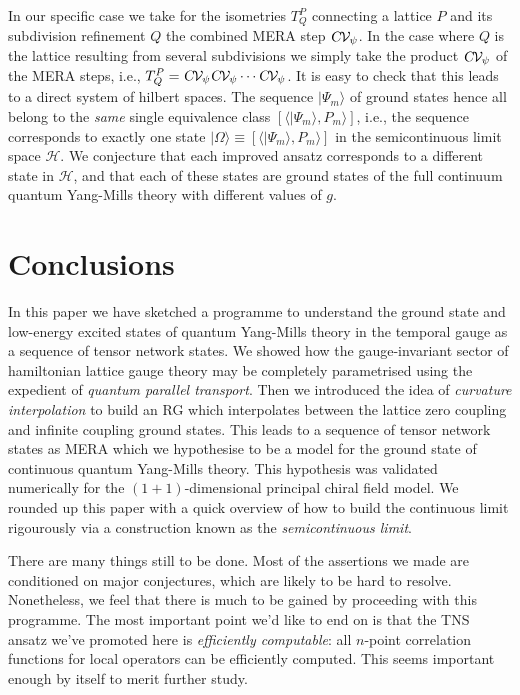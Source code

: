 \documentclass[twocolumn,lengthcheck,superscriptaddress]{revtex4-1}
\theoremstyle{definition}
\theoremstyle{remark}
\begin{document}
In our specific case we take for the isometries $T^{P}_Q$ connecting a lattice $P$ and its subdivision refinement $Q$ the combined MERA step $\textsl{C}\mathcal{V}_{\psi}$. In the case where $Q$ is the lattice resulting from several subdivisions we simply take the product $\textsl{C}\mathcal{V}_{\psi}$ of the MERA steps, i.e., $T^{P}_Q = \textsl{C}\mathcal{V}_{\psi}\textsl{C}\mathcal{V}_{\psi}\cdots \textsl{C}\mathcal{V}_{\psi}$. It is easy to check that this leads to a direct system of hilbert spaces. The sequence $|\Psi_m\rangle$ of ground states hence all belong to the \emph{same} single equivalence class $[\langle |\Psi_m\rangle, P_m\rangle]$, i.e., the sequence corresponds to exactly one state $|\Omega\rangle \equiv [\langle |\Psi_m\rangle, P_m\rangle]$ in the semicontinuous limit space $\mathcal{H}$. We conjecture that each improved ansatz corresponds to a different state in $\mathcal{H}$, and that each of these states are ground states of the full continuum quantum Yang-Mills theory with different values of $g$. 

\section{Conclusions}
In this paper we have sketched a programme to understand the ground state and low-energy excited states of quantum Yang-Mills theory in the temporal gauge as a sequence of tensor network states. We showed how the gauge-invariant sector of hamiltonian lattice gauge theory may be completely parametrised using the expedient of \emph{quantum parallel transport}. Then we introduced the idea of \emph{curvature interpolation} to build an RG which interpolates between the lattice zero coupling and infinite coupling ground states. This leads to a sequence of tensor network states as MERA which we hypothesise to be a model for the ground state of continuous quantum Yang-Mills theory. This hypothesis was validated numerically for the $(1+1)$-dimensional principal chiral field model. We rounded up this paper with a quick overview of how to build the continuous limit rigourously via a construction known as the \emph{semicontinuous limit}. 

There are many things still to be done. Most of the assertions we made are conditioned on major conjectures, which are likely to be hard to resolve. Nonetheless, we feel that there is much to be gained by proceeding with this programme. The most important point we'd like to end on is that the TNS ansatz we've promoted here is \emph{efficiently computable}: all $n$-point correlation functions for local operators can be efficiently computed. This seems important enough by itself to merit further study. 



\end{document}
